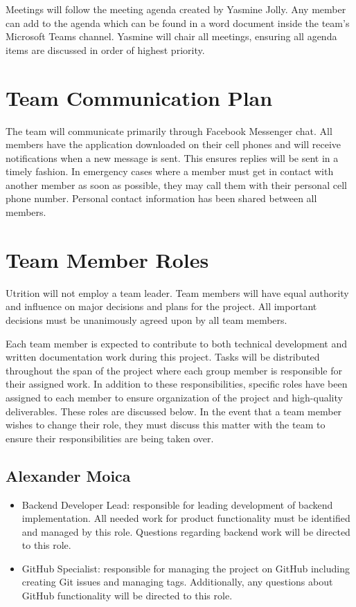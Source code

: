 \documentclass{article}
\begin{document}
Meetings will follow the meeting agenda created by Yasmine Jolly. Any member can add to the agenda which can be found in a word document inside the team's Microsoft Teams channel. Yasmine will chair all meetings, ensuring all agenda items are discussed in order of highest priority.

\section{Team Communication Plan}

The team will communicate primarily through Facebook Messenger chat. All members have the application downloaded on their cell phones and will receive notifications when a new message is sent. This ensures replies will be sent in a timely fashion. In emergency cases where a member must get in contact with another member as soon as possible, they may call them with their personal cell phone number. Personal contact information has been shared between all members.

\section{Team Member Roles}

Utrition will not employ a team leader. Team members will have equal authority and influence on major decisions and plans for the project. All important decisions must be unanimously agreed upon by all team members.

Each team member is expected to contribute to both technical development and written documentation work during this project. Tasks will be distributed throughout the span of the project where each group member is responsible for their assigned work. In addition to these responsibilities, specific roles have been assigned to each member to ensure organization of the project and high-quality deliverables. These roles are discussed below. In the event that a team member wishes to change their role, they must discuss this matter with the team to ensure their responsibilities are being taken over.

\subsection{Alexander Moica}

\begin{itemize}
	\item Backend Developer Lead: responsible for leading development of backend implementation. All needed work for product functionality must be identified and managed by this role. Questions regarding backend work will be directed to this role.
	\item GitHub Specialist: responsible for managing the project on GitHub including creating Git issues and managing tags. Additionally, any questions about GitHub functionality will be directed to this role.
\end{itemize}
\end{document}
